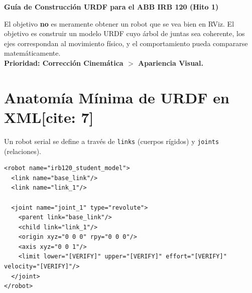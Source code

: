\documentclass[11pt, a4paper]{article}
\begin{document}
\begin{center}
    \Large\textbf{\textcolor{ucbblue}{Guía de Construcción URDF para el ABB IRB 120 (Hito 1)}}\\[0.2cm]
\end{center}

\begin{tcolorbox}[colback=red!5, colframe=red!75!black, title=\textbf{Propósito de la Guía[cite: 7]}]
    El objetivo \textbf{no} es meramente obtener un robot que se vea bien en RViz. El objetivo es construir un modelo URDF cuyo árbol de juntas sea coherente, los ejes correspondan al movimiento físico, y el comportamiento pueda compararse matemáticamente. \\
    \textbf{Prioridad: Corrección Cinemática $>$ Apariencia Visual.}
\end{tcolorbox}

\section{Anatomía Mínima de URDF en XML[cite: 7]}
Un robot serial se define a través de \texttt{links} (cuerpos rígidos) y \texttt{joints} (relaciones).
\begin{lstlisting}
<robot name="irb120_student_model">
  <link name="base_link"/>
  <link name="link_1"/>

  <joint name="joint_1" type="revolute">
    <parent link="base_link"/>
    <child link="link_1"/>
    <origin xyz="0 0 0" rpy="0 0 0"/>
    <axis xyz="0 0 1"/>
    <limit lower="[VERIFY]" upper="[VERIFY]" effort="[VERIFY]" velocity="[VERIFY]"/>
  </joint>
</robot>
\end{lstlisting}

\begin{center}
\end{center}
\end{document}
